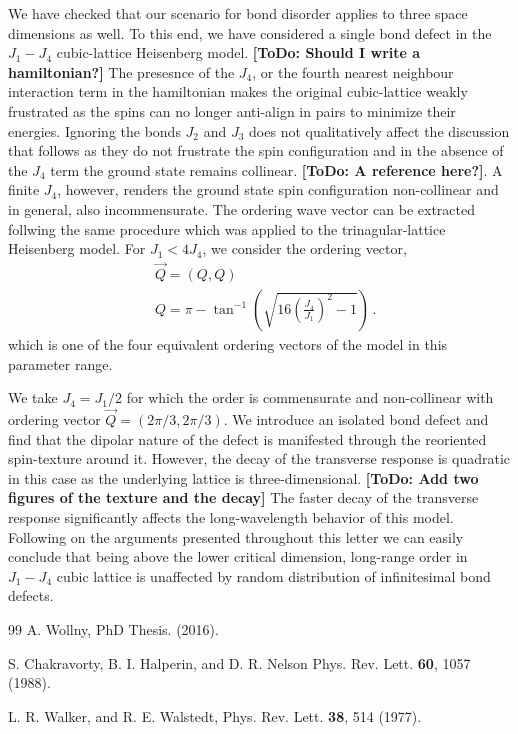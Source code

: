 \documentclass[twocolumn,english,aps,prl,floatfix]{revtex4-1}
\newcommand{\todo}[1]{{\color{red} {\bf [ToDo: #1]}}}
\begin{document}
We have checked that our scenario for bond disorder applies to three 
space dimensions as well. To this end, we have considered a single 
bond defect in the $J_1-J_4$ cubic-lattice Heisenberg model.
\todo{Should I write a hamiltonian?}
The presesnce of the $J_4$, or the fourth nearest neighbour interaction
term in the hamiltonian makes the original cubic-lattice weakly 
frustrated as the spins can no longer anti-align in pairs to minimize
their energies. Ignoring the bonds $ J_2 $ and $ J_3$ does not qualitatively 
affect the discussion that follows as they do not frustrate the spin 
configuration and in the absence of the $ J_4$ term the ground
state remains collinear. \todo{A reference here?}. A finite $J_4$, 
however, renders the ground state spin configuration non-collinear
and in general, also incommensurate. The ordering wave vector 
can be extracted follwing the same procedure which was applied to 
the trinagular-lattice Heisenberg model. For $J_1<4 J_4$, we consider
the ordering vector,
\begin{equation}
    \begin{aligned}
        &\vec{Q} = (Q,Q) \\
        &Q = \pi - \tan^{-1}
        \left(\sqrt{16\left(\frac{J_4}{J_1}\right)^2-1}
        \right)\,.
    \end{aligned}
\end{equation}
which is one of the four equivalent ordering vectors of the model 
in this parameter range. 

We take $J_4 = J_1/2$ for which the order is commensurate and 
non-collinear with ordering vector $\vec{Q}=(2\pi/3,2\pi/3)$. We 
introduce an isolated bond defect and find that the dipolar nature of 
the defect is manifested through the reoriented spin-texture around it. 
However, the decay of the transverse response is quadratic in this 
case as the underlying lattice is three-dimensional.
\todo{Add two figures of the texture and the decay}
The faster decay of the transverse response significantly affects the
long-wavelength behavior of this model. Following on the arguments 
presented throughout this letter we can easily conclude that being 
above the lower critical dimension, long-range order in $J_1-J_4$ 
cubic lattice is unaffected by random distribution of infinitesimal 
bond defects.

\begin{thebibliography}{99}
        A. Wollny,
        PhD Thesis. (2016).

        S. Chakravorty, B. I. Halperin, and D. R. Nelson
        Phys. Rev. Lett. \textbf{60}, 1057 (1988).

        L. R. Walker, and R. E. Walstedt,
        Phys. Rev. Lett. \textbf{38}, 514 (1977).
\end{thebibliography}
\end{document}
